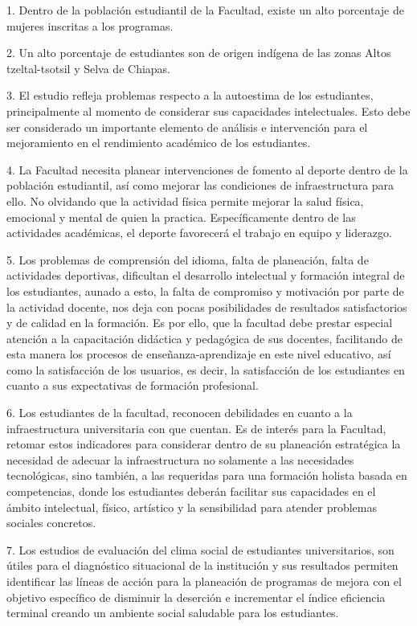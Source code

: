 \begin{Obs}
\item[1.]  Dentro de la población estudiantil de la Facultad, existe un alto porcentaje
de mujeres inscritas a los programas.
\item[2.] Un alto porcentaje de estudiantes son de origen indígena de las zonas Altos
tzeltal-tsotsil y Selva de Chiapas.
\item[3.] El estudio refleja problemas respecto a la autoestima de los estudiantes,
principalmente al momento de considerar sus capacidades intelectuales. Esto
debe ser considerado un importante elemento de análisis e intervención para
el mejoramiento en el rendimiento académico de los estudiantes.
\item[4.] La Facultad necesita planear intervenciones de fomento al deporte dentro de
la población estudiantil, así como mejorar las condiciones de
infraestructura para ello. No olvidando que la actividad física permite
mejorar la salud física, emocional y mental de quien la practica.
Específicamente dentro de las actividades académicas, el deporte favorecerá
el trabajo en equipo y liderazgo.
\item[5.] Los problemas de comprensión del idioma, falta de planeación, falta de
actividades deportivas, dificultan el desarrollo intelectual y formación
integral de los estudiantes, aunado a esto, la falta de compromiso y
motivación por parte de la actividad docente, nos deja con pocas
posibilidades de resultados satisfactorios y de calidad en la formación. Es
por ello, que la facultad debe prestar especial atención a la capacitación
didáctica y pedagógica de sus docentes, facilitando de esta manera los
procesos de enseñanza-aprendizaje en este nivel educativo, así como la
satisfacción de los usuarios, es decir, la satisfacción de los estudiantes
en cuanto a sus expectativas de formación profesional.
\item[6.]   
Los estudiantes de la facultad, reconocen debilidades en cuanto a la
infraestructura universitaria con que cuentan. Es de interés para la
Facultad, retomar estos indicadores para considerar dentro de su planeación
estratégica la necesidad de adecuar la infraestructura no solamente a las
necesidades tecnológicas, sino también, a las requeridas para una formación
holista basada en competencias, donde los estudiantes deberán facilitar sus
capacidades en el ámbito intelectual, físico, artístico y la sensibilidad
para atender problemas sociales concretos.
\item[7.] Los estudios de evaluación del clima social de estudiantes universitarios,
son útiles para el diagnóstico situacional de la institución y sus
resultados permiten identificar las líneas de acción para la planeación de
programas de mejora con el objetivo específico de disminuir la deserción e
incrementar el índice eficiencia terminal creando un ambiente social
saludable para los estudiantes.
\end{Obs}
\newpage

